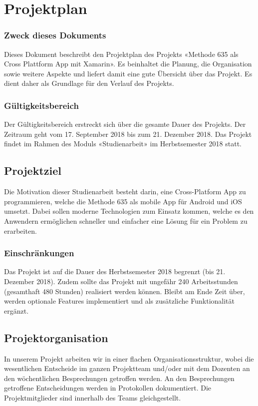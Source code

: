 \section{Projektplan}

\subsubsection*{Zweck dieses Dokuments}
Dieses Dokument beschreibt den Projektplan des Projekts «Methode 635 als Cross Plattform App mit Xamarin». Es beinhaltet die Planung, die Organisation sowie weitere Aspekte und liefert damit eine gute Übersicht über das Projekt. Es dient daher als Grundlage für den Verlauf des Projekts.

\subsubsection*{Gültigkeitsbereich}
Der Gültigkeitsbereich erstreckt sich über die gesamte Dauer des Projekts. Der Zeitraum geht vom 17. September 2018 bis zum 21. Dezember 2018. Das Projekt findet im Rahmen des Moduls «Studienarbeit» im Herbstsemester 2018 statt.

\subsection{Projektziel}
Die Motivation dieser Studienarbeit besteht darin, eine Cross-Platform App zu programmieren, welche die Methode 635 \cite{methode-635} als mobile App für Android und iOS umsetzt. Dabei sollen moderne Technologien zum Einsatz kommen, welche es den Anwendern ermöglichen schneller und einfacher eine Lösung für ein Problem zu erarbeiten.

\subsubsection*{Einschränkungen}
Das Projekt ist auf die Dauer des Herbstsemester 2018 begrenzt (bis 21. Dezember 2018). Zudem sollte das Projekt mit ungefähr 240 Arbeitsstunden (gesamthaft 480 Stunden) realisiert werden können. Bleibt am Ende Zeit über, werden optionale Features implementiert und als zusätzliche Funktionalität ergänzt.

\subsection{Projektorganisation}
In unserem Projekt arbeiten wir in einer flachen Organisationsstruktur, wobei die wesentlichen Entscheide im ganzen Projektteam und/oder mit dem Dozenten an den wöchentlichen Besprechungen getroffen werden. An den Besprechungen getroffene Entscheidungen werden in Protokollen dokumentiert. Die Projektmitglieder sind innerhalb des Teams gleichgestellt.

